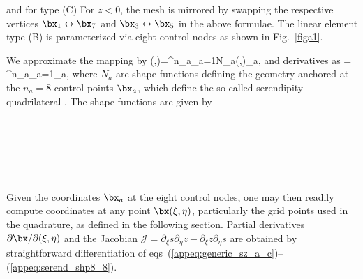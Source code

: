 %
\eq \label{appeq:sz_bot_a}
\en
%
and for type (C)
\eq \label{appeq:sz_bot_c}
\en
%
For $z<0$, the mesh is mirrored by swapping the respective vertices 
$\bx_1 \leftrightarrow \bx_7$ and $\bx_3 \leftrightarrow \bx_5$ 
in the above formulae.
The linear element type (B) is parameterized via eight control nodes as shown 
in Fig.~\ref{figa1}. 

We approximate the mapping by \cite[e.g.][]{KoTr99}
%
\eq
\bx(\xi,\eta)=\sum^{n_a}_{a=1}N_a(\xi,\eta)\bx_a,\; \textrm{and derivatives as}
\;\;\;=
\sum^{n_a}_{a=1}\bx_a,
\en
where $N_a$ are shape functions defining the geometry anchored at the $n_a=8$ 
control points $\bx_a$, which define the so-called serendipity quadrilateral
\citep{hughes}. The shape functions are given by
%
\eqa 
{}
\label{appeq:serend_shp8_1}\\
\\
\\
\\
\\
\\
\\
\label{appeq:serend_shp8_8}
\ena
%
Given the coordinates $\bx_a$ at the eight control nodes, one may then readily 
compute coordinates at any point $\bx(\xi,\eta)$, 
particularly the grid points used in the quadrature, 
as defined in the following section. 
%
Partial derivatives $\partial\bx/\partial(\xi,\eta)$ and the Jacobian 
${\mathcal J}=\partial_\xi{s}\partial_\eta{z}-\partial_\xi{z}\partial_\eta{s}$
are obtained by straightforward differentiation of 
eqs~(\ref{appeq:generic_sz_a_c})--(\ref{appeq:serend_shp8_8}).
%
%
